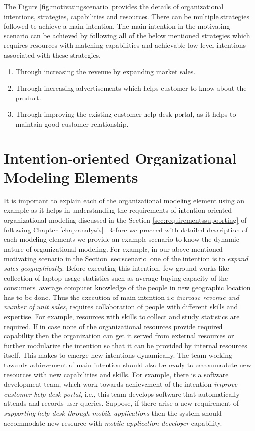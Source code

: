 The Figure \ref{fig:motivatingscenario} provides the details of organizational intentions, strategies, capabilities and resources. There can be multiple strategies followed to achieve a main intention. The main intention in the motivating scenario can be achieved by following all of the below mentioned strategies which requires resources with matching capabilities and achievable low level intentions associated with these strategies. 
 
 \begin{enumerate}
 	\item Through increasing the revenue by expanding market sales. 
 	\item Through increasing advertisements which helps customer to know about the product.
 	\item Through improving the existing customer help desk portal, as it helps to maintain good customer relationship.
 \end{enumerate}
 
\section{Intention-oriented Organizational Modeling Elements}
\label{sec:entities}
It is important to explain each of the organizational modeling element using an example as it helps in understanding the requirements of intention-oriented organizational modeling discussed in the Section \ref{sec:requirementssupoorting} of following Chapter \ref{chap:analysis}. Before we proceed with detailed description of each modeling elements we provide an example scenario to know the dynamic nature of organizational modeling. For example, in our above mentioned motivating scenario in the Section \ref{sec:scenario} one of the intention is to \textit{expand sales geographically}. Before executing this intention, few ground works like collection of laptop usage statistics such as average buying capacity of the consumers, average computer knowledge of the people in new geographic location has to be done. Thus the execution of main intention i.e \textit{increase revenue and number of unit sales}, requires collaboration of people with different skills and expertise. For example, resources with skills to collect and study statistics are required. If in case none of the organizational resources provide required capability then the organization can get it served from external resources or further modularize the intention so that it can be provided by internal resources itself. This makes to emerge new intentions dynamically. The team working towards achievement of main intention should also be ready to accommodate new resources with new capabilities and skills. For example, there is a software development team, which work towards achievement of the intention \textit{improve customer help desk portal}, i.e., this team develops software that automatically attends and records user queries. Suppose, if there arise a new requirement of \textit{supporting help desk through mobile applications} then the system should accommodate new resource with \textit{mobile application developer} capability. 

